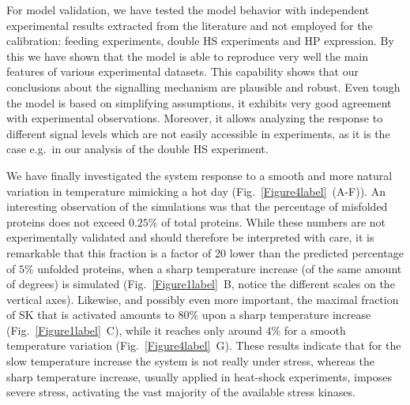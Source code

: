 \documentclass[oneside, 10pt, a4paper, twocolumn]{article}
\begin{document}
For model validation,  we have tested the model behavior with independent experimental results extracted from the literature and not employed for the calibration: 
feeding experiments, %
double HS experiments and %
HP expression. %
By this we have shown that the model is able to reproduce very well the main features of various experimental datasets. This capability shows that our conclusions about the signalling mechanism are plausible and robust.
Even tough the model is based on simplifying assumptions, it exhibits very good agreement with experimental observations. Moreover, it allows analyzing the response to different signal levels which are not easily accessible in experiments, as it is the case e.g.~in our analysis of the double HS experiment. 

We have finally investigated the system response to a smooth and more natural variation in temperature mimicking a hot day (Fig.~\ref{Figure4label}~(A-F)).
An interesting observation of the simulations was that the percentage of misfolded proteins does not exceed $0.25 \%$ of total proteins.
While these numbers are not experimentally validated and should therefore be interpreted with care, it is remarkable that this fraction
is a factor of 20 lower than the predicted percentage of $5\%$ unfolded proteins, when a sharp temperature increase (of the same amount of degrees) is simulated
(Fig.~\ref{Figure1label}~B, notice the different scales on the vertical axes).
Likewise, and possibly even more important, the maximal fraction of SK that is activated amounts to $80\%$ upon a sharp temperature increase (Fig.~\ref{Figure1label}~C),
while it reaches only around $4\%$ for a smooth temperature variation (Fig.~\ref{Figure4label}~G).
These results indicate that for the slow temperature increase the system is not really under stress, whereas the sharp temperature increase,
usually applied in heat-shock experiments, imposes severe stress, activating the vast majority of the available stress kinases.
\end{document}
